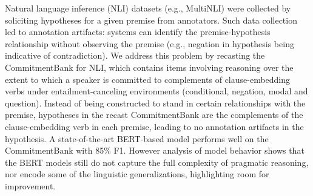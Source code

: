 Natural language inference (NLI) datasets (e.g., MultiNLI) were collected by soliciting hypotheses for a given premise from annotators. Such data collection led to annotation artifacts: systems can identify the premise-hypothesis relationship without observing the premise (e.g., negation in hypothesis being indicative of contradiction). We address this problem by recasting the CommitmentBank for NLI, which contains items involving reasoning over the extent to which a speaker is committed to complements of clause-embedding verbs under entailment-canceling environments (conditional, negation, modal and question). Instead of being constructed to stand in certain relationships with the premise, hypotheses in the recast CommitmentBank are the complements of the clause-embedding verb in each premise, leading to no annotation artifacts in the hypothesis. A state-of-the-art BERT-based model performs well on the CommitmentBank with 85\% F1. However analysis of model behavior shows that the BERT models still do not capture the full complexity of pragmatic reasoning, nor encode some of the linguistic generalizations, highlighting room for improvement.